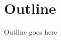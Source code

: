 \begin{comment}


--> We use email also more daily communication, onlar bize soru soruyor iletisim olusuyor.

(paper E21 p 442, and E5)To date, researchers have used Web page-based surveys to study large groups of on-line users (e.g. Kehoe, Pitkow and Morton, 1997) and e-mail surveys to study smaller, more homogenous on-line user groups (e.g. Parker, 1992; Smith, 1997; Tse et al, 1995). However, it appears that a relatively untapped use for the Internet is to use e-mail is to survey broader Internet populations on both a national and international basis. WRITE the problems in here as well form that paper. Problems related from researchers perspective. Also mention briefly about the purpose and design of the those surveys.


Reaching out large-scale of people via internet is a fast and cost efficient way comparing with postal mail or telephone. Therefore, email has been used not just for research, but also for marketing, customer support, and other data collection purposes. However, getting an acceptable response rates on the sent out emails requires additional efforts from the researchers' side. This thesis investigates a communication system which contributes increasing the response rates while minimizing the burden on the researchers' side. 

As aforementioned studies showed that different forms of personalization increase the response rates in email communication. However, it has become very easy to add personalized information into email thanks to the softwares. Dillman, et al. (2009) stated that over-personalization using software tools might easily result impersonal messages.

Moreover, experienced email users can identify if a message is written by a person or computer generated by looking appearance of one's name in certain locations, and similar patterns for other information \citep[page 272]{DillmanDonA.SmythJoleneD.Christian2009}. Therefore, it becomes difficult to have a correct amount and tone of personalization. The more daily interaction with digital devices will make the true authentic personalization more rare, hence achieving it will make it more important and effective \citep[page 238]{DillmanDonA.SmythJoleneD.Christian2009}.

\end{comment}

\section{Outline}
\label{sec:3:Outline}
Outline goes here

